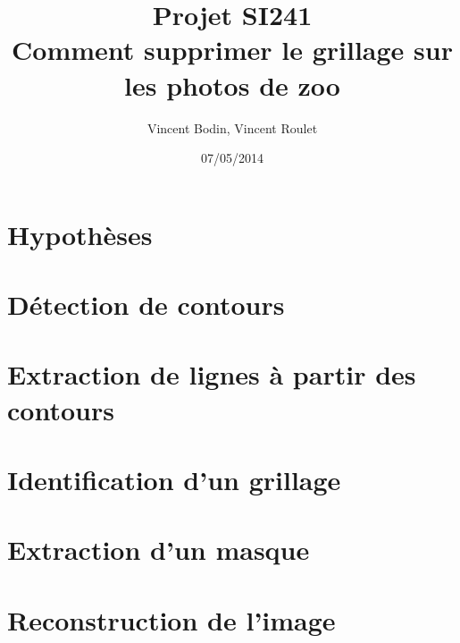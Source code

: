 \documentclass[10pt,a4paper]{article}
\title{Projet SI241 \\Comment supprimer le grillage sur les photos de zoo}
\date{07/05/2014}
\author{Vincent Bodin, Vincent Roulet}
\begin{document}
\maketitle
\begin{abstract}

\end{abstract}
\section{Hypothèses}
\section{Détection de contours}
\section{Extraction de lignes à partir des contours}
\section{Identification d'un grillage}
\section{Extraction d'un masque}
\section{Reconstruction de l'image}
\end{document}
